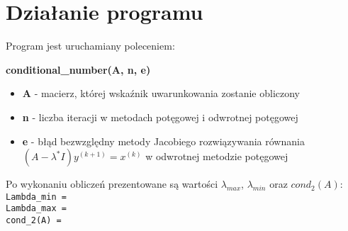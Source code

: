 \documentclass[]{article}
\begin{document}
\section{Działanie programu}

Program jest uruchamiany poleceniem:
\begin{center}
	\textbf{conditional\_number(A, n, e)}
\end{center} 
\begin{itemize}
	\item \textbf{A} - macierz, której wskaźnik uwarunkowania zostanie obliczony
	\item \textbf{n} - liczba iteracji w metodach potęgowej i odwrotnej potęgowej
	\item \textbf{e} - błąd bezwzględny metody Jacobiego rozwiązywania równania \\$(A - \lambda^{*}I)y^{(k+1)} = x^{(k)}$ w odwrotnej metodzie potęgowej
\end{itemize}
Po wykonaniu obliczeń prezentowane są wartości $\lambda_{max}$, $\lambda_{min}$ oraz $cond_2(A)$:\\
\verb|Lambda_min = |\\
\verb|Lambda_max = |\\
\verb|cond_2(A) = |
\end{document}
